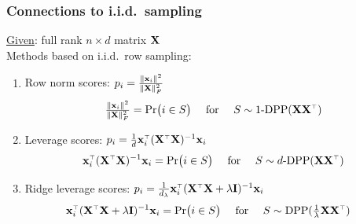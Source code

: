 \documentclass[handout]{beamer}
\begin{document}
\begin{frame}
  \frametitle{Connections to i.i.d.~sampling}
  \underline{Given}: full rank $n\times d$ matrix $\mathbf X$\\[2mm]
Methods based on i.i.d.~row sampling:\pause
  \begin{enumerate}
    \item Row norm scores:
      $p_i=\frac{\|\mathbf x_i\|^2}{\|\mathbf X\|_F^2}$\pause\vspace{-3mm}
      \begin{align*}
        \tfrac{\|\x_i\|^2}{\|\X\|_F^2} = \Pr\big(i\in S\big)
        \quad\text{ for }\quad
        S\sim 1\text{-}\DPP(\X\X^\top)
      \end{align*}\pause\vspace{-5mm}
    \item Leverage scores: $p_i=\frac1d\x_i^\top(\X^\top\X)^{-1}\x_i$\pause\vspace{-3mm}
      \begin{align*}
        \x_i^\top(\X^\top\X)^{-1}\x_i = \Pr\big(i\in S\big)\quad\text{ for }\quad
        S\sim d\text{-}\DPP(\X\X^\top)
      \end{align*}\pause\vspace{-5mm}
    \item Ridge leverage scores: $p_i =\frac1{d_\lambda}
      \x_i^\top(\X^\top\X+\lambda\I)^{-1}\x_i$\pause\vspace{-3mm}
      \begin{align*}
        \x_i^\top(\X^\top\X+\lambda\I)^{-1}\x_i &= \Pr\big(i\in S\big)\quad\text{ for }\quad
        S\sim \DPP(\tfrac1\lambda\X\X^\top)
      \end{align*}
    \end{enumerate}      
  \end{frame}
\end{document}
